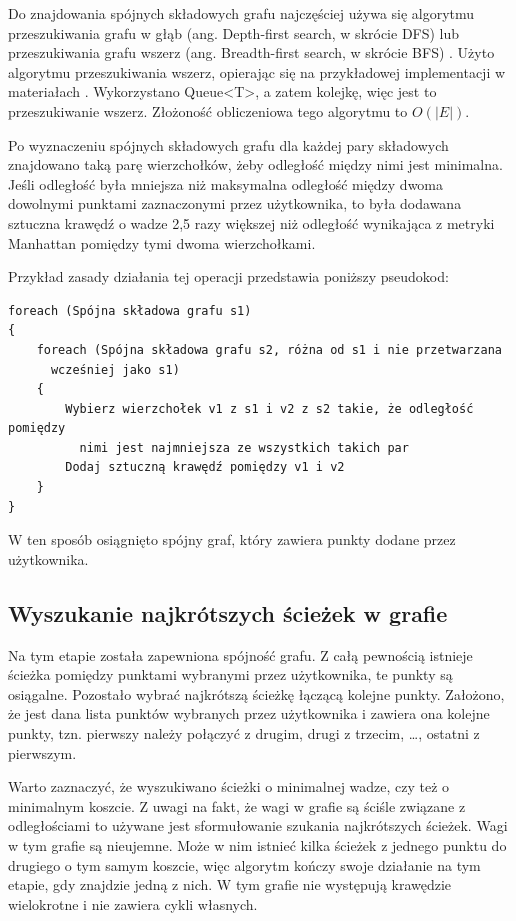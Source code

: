 \documentclass[a4paper,11pt,twoside,openright]{report}
\theoremstyle{definition}
\begin{document}
Do znajdowania spójnych składowych grafu najczęściej używa się algorytmu
przeszukiwania grafu w głąb (ang. Depth-first search, w skrócie DFS) lub
przeszukiwania grafu wszerz (ang. Breadth-first search, w skrócie BFS)
\cite{Algorytmy Sedgewick}. Użyto algorytmu przeszukiwania wszerz, opierając się
na przykładowej implementacji w materiałach \cite{AiSD2}. Wykorzystano Queue<T>,
a zatem kolejkę, więc jest to przeszukiwanie wszerz. Złożoność obliczeniowa tego
algorytmu to $O(|E|)$.

Po wyznaczeniu spójnych składowych grafu dla każdej pary składowych znajdowano
taką parę wierzchołków, żeby odległość między nimi jest minimalna. Jeśli odległość
była mniejsza niż maksymalna odległość między dwoma dowolnymi punktami zaznaczonymi
przez użytkownika, to była dodawana sztuczna krawędź o wadze 2,5 razy większej
niż odległość wynikająca z metryki Manhattan pomiędzy tymi dwoma wierzchołkami.

Przykład zasady działania tej operacji przedstawia poniższy pseudokod:

\begin{verbatim}
foreach (Spójna składowa grafu s1)
{
    foreach (Spójna składowa grafu s2, różna od s1 i nie przetwarzana
      wcześniej jako s1)
    {
        Wybierz wierzchołek v1 z s1 i v2 z s2 takie, że odległość pomiędzy
          nimi jest najmniejsza ze wszystkich takich par
        Dodaj sztuczną krawędź pomiędzy v1 i v2
    }
}
\end{verbatim}


W ten sposób osiągnięto spójny graf, który zawiera punkty dodane przez użytkownika.

\subsection {Wyszukanie najkrótszych ścieżek w grafie}

Na tym etapie została zapewniona spójność grafu. Z całą pewnością istnieje ścieżka
pomiędzy punktami wybranymi przez użytkownika, te punkty są osiągalne. Pozostało
wybrać najkrótszą ścieżkę łączącą kolejne punkty. Założono, że jest dana lista
punktów wybranych przez użytkownika i zawiera ona kolejne punkty, tzn. pierwszy
należy połączyć z drugim, drugi z trzecim, \dots, ostatni z pierwszym.

Warto zaznaczyć, że wyszukiwano ścieżki o minimalnej wadze, czy też o minimalnym
koszcie. Z uwagi na fakt, że wagi w grafie są ściśle związane z odległościami to
używane jest sformułowanie szukania najkrótszych ścieżek. Wagi w tym grafie są
nieujemne. Może w nim istnieć kilka ścieżek z jednego punktu do drugiego o tym
samym koszcie, więc algorytm kończy swoje działanie na tym etapie, gdy znajdzie
jedną z nich. W tym grafie nie występują krawędzie wielokrotne i nie zawiera
cykli własnych.
\end{document}
